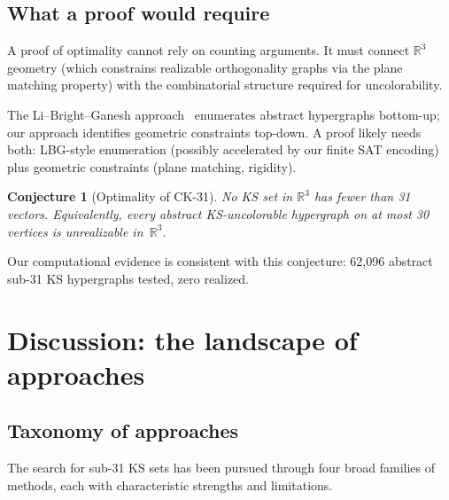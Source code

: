 \documentclass[twocolumn,pra,superscriptaddress,nofootinbib]{revtex4-2}
\newtheorem{conjecture}{Conjecture}
\newcommand{\R}{\mathbb{R}}
\begin{document}
\subsection{What a proof would require}\label{sec:proofstrategy}

A proof of optimality cannot rely on counting arguments. It must connect $\R^3$ geometry (which constrains realizable orthogonality graphs via the plane matching property) with the combinatorial structure required for uncolorability.

The Li--Bright--Ganesh approach~\cite{LiBrightGanesh2024} enumerates abstract hypergraphs bottom-up; our approach identifies geometric constraints top-down. A proof likely needs both: LBG-style enumeration (possibly accelerated by our finite SAT encoding) plus geometric constraints (plane matching, rigidity).

\begin{conjecture}[Optimality of CK-31]
\label{conj:optimality}
No KS set in $\R^3$ has fewer than 31 vectors. Equivalently, every abstract KS-uncolorable hypergraph on at most 30 vertices is unrealizable in~$\R^3$.
\end{conjecture}

Our computational evidence is consistent with this conjecture: 62,096 abstract sub-31 KS hypergraphs tested, zero realized.

\section{Discussion: the landscape of approaches}
\label{sec:discussion}

\subsection{Taxonomy of approaches}

The search for sub-31 KS sets has been pursued through four broad families of
methods, each with characteristic strengths and limitations.
\end{document}
